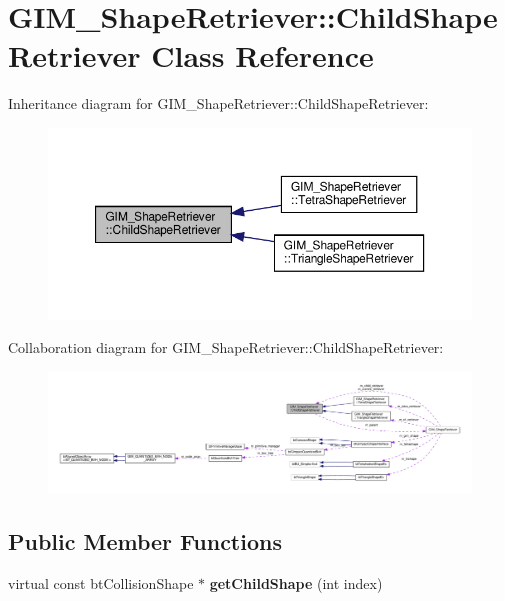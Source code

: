 \hypertarget{classGIM__ShapeRetriever_1_1ChildShapeRetriever}{}\section{G\+I\+M\+\_\+\+Shape\+Retriever\+:\+:Child\+Shape\+Retriever Class Reference}
\label{classGIM__ShapeRetriever_1_1ChildShapeRetriever}


Inheritance diagram for G\+I\+M\+\_\+\+Shape\+Retriever\+:\+:Child\+Shape\+Retriever\+:
\nopagebreak
\begin{figure}[H]
\begin{center}
\leavevmode
\includegraphics[width=350pt]{classGIM__ShapeRetriever_1_1ChildShapeRetriever__inherit__graph}
\end{center}
\end{figure}


Collaboration diagram for G\+I\+M\+\_\+\+Shape\+Retriever\+:\+:Child\+Shape\+Retriever\+:
\nopagebreak
\begin{figure}[H]
\begin{center}
\leavevmode
\includegraphics[width=350pt]{classGIM__ShapeRetriever_1_1ChildShapeRetriever__coll__graph}
\end{center}
\end{figure}
\subsection*{Public Member Functions}
\begin{DoxyCompactItemize}
\item 
\mbox{\label{classGIM__ShapeRetriever_1_1ChildShapeRetriever_a6b3a147fb160d3d117a203e7472a7dbe}} 
virtual const bt\+Collision\+Shape $\ast$ {\bfseries get\+Child\+Shape} (int index)
\end{DoxyCompactItemize}

